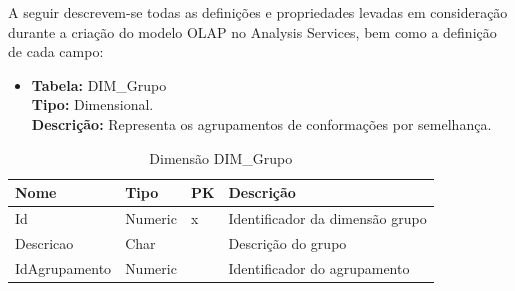 A seguir descrevem-se todas as definições e propriedades levadas em consideração durante a criação do modelo OLAP no Analysis Services, bem como a definição de cada campo:
	
\begin{itemize}
	\item
		\textbf{Tabela:} DIM\_Grupo \\
		\textbf{Tipo:} Dimensional. \\
		\textbf{Descrição:} Representa os agrupamentos de conformações por semelhança.
\end{itemize}
\begin{table}[h]
	\caption{Dimensão DIM\_Grupo}
	\centering
	\begin{tabular}{@{}llll@{}}
	\toprule
	\textbf{Nome} & \textbf{Tipo} & \textbf{PK} & \textbf{Descrição}           		\\ \midrule
	Id            & Numeric           & x           & Identificador da dimensão grupo   \\
	Descricao     & Char       &             & Descrição do grupo           		\\
	IdAgrupamento & Numeric          &             & Identificador do agrupamento 		\\ \bottomrule
	\end{tabular}
\end{table}


\newpage

